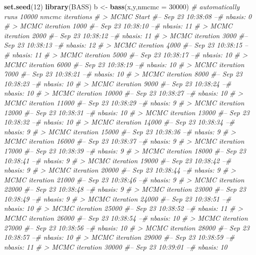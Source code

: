 \documentclass[
]{article}
\newenvironment{Shaded}{\begin{snugshade}}{\end{snugshade}}
\newcommand{\CommentTok}[1]{\textcolor[rgb]{0.56,0.35,0.01}{\textit{#1}}}
\newcommand{\DataTypeTok}[1]{\textcolor[rgb]{0.13,0.29,0.53}{#1}}
\newcommand{\DecValTok}[1]{\textcolor[rgb]{0.00,0.00,0.81}{#1}}
\newcommand{\KeywordTok}[1]{\textcolor[rgb]{0.13,0.29,0.53}{\textbf{#1}}}
\newcommand{\NormalTok}[1]{#1}
\newcommand{\StringTok}[1]{\textcolor[rgb]{0.31,0.60,0.02}{#1}}
\begin{document}
\begin{Shaded}
\begin{Highlighting}[]
\KeywordTok{set.seed}\NormalTok{(}\DecValTok{12}\NormalTok{)}
\KeywordTok{library}\NormalTok{(BASS)}
\NormalTok{b <-}\StringTok{ }\KeywordTok{bass}\NormalTok{(x,y,}\DataTypeTok{nmcmc =} \DecValTok{30000}\NormalTok{) }\CommentTok{# automatically runs 10000 nmcmc iterations}
\CommentTok{# > MCMC Start #-- Sep 23 10:38:08 --# nbasis: 0 }
\CommentTok{# > MCMC iteration 1000 #-- Sep 23 10:38:10 --# nbasis: 11 }
\CommentTok{# > MCMC iteration 2000 #-- Sep 23 10:38:12 --# nbasis: 11 }
\CommentTok{# > MCMC iteration 3000 #-- Sep 23 10:38:13 --# nbasis: 12 }
\CommentTok{# > MCMC iteration 4000 #-- Sep 23 10:38:15 --# nbasis: 11 }
\CommentTok{# > MCMC iteration 5000 #-- Sep 23 10:38:17 --# nbasis: 10 }
\CommentTok{# > MCMC iteration 6000 #-- Sep 23 10:38:19 --# nbasis: 10 }
\CommentTok{# > MCMC iteration 7000 #-- Sep 23 10:38:21 --# nbasis: 10 }
\CommentTok{# > MCMC iteration 8000 #-- Sep 23 10:38:23 --# nbasis: 10 }
\CommentTok{# > MCMC iteration 9000 #-- Sep 23 10:38:24 --# nbasis: 10 }
\CommentTok{# > MCMC iteration 10000 #-- Sep 23 10:38:27 --# nbasis: 10 }
\CommentTok{# > MCMC iteration 11000 #-- Sep 23 10:38:29 --# nbasis: 9 }
\CommentTok{# > MCMC iteration 12000 #-- Sep 23 10:38:31 --# nbasis: 10 }
\CommentTok{# > MCMC iteration 13000 #-- Sep 23 10:38:32 --# nbasis: 10 }
\CommentTok{# > MCMC iteration 14000 #-- Sep 23 10:38:34 --# nbasis: 9 }
\CommentTok{# > MCMC iteration 15000 #-- Sep 23 10:38:36 --# nbasis: 9 }
\CommentTok{# > MCMC iteration 16000 #-- Sep 23 10:38:37 --# nbasis: 9 }
\CommentTok{# > MCMC iteration 17000 #-- Sep 23 10:38:39 --# nbasis: 9 }
\CommentTok{# > MCMC iteration 18000 #-- Sep 23 10:38:41 --# nbasis: 9 }
\CommentTok{# > MCMC iteration 19000 #-- Sep 23 10:38:42 --# nbasis: 9 }
\CommentTok{# > MCMC iteration 20000 #-- Sep 23 10:38:44 --# nbasis: 9 }
\CommentTok{# > MCMC iteration 21000 #-- Sep 23 10:38:46 --# nbasis: 9 }
\CommentTok{# > MCMC iteration 22000 #-- Sep 23 10:38:48 --# nbasis: 9 }
\CommentTok{# > MCMC iteration 23000 #-- Sep 23 10:38:49 --# nbasis: 9 }
\CommentTok{# > MCMC iteration 24000 #-- Sep 23 10:38:51 --# nbasis: 10 }
\CommentTok{# > MCMC iteration 25000 #-- Sep 23 10:38:52 --# nbasis: 11 }
\CommentTok{# > MCMC iteration 26000 #-- Sep 23 10:38:54 --# nbasis: 10 }
\CommentTok{# > MCMC iteration 27000 #-- Sep 23 10:38:56 --# nbasis: 10 }
\CommentTok{# > MCMC iteration 28000 #-- Sep 23 10:38:57 --# nbasis: 10 }
\CommentTok{# > MCMC iteration 29000 #-- Sep 23 10:38:59 --# nbasis: 11 }
\CommentTok{# > MCMC iteration 30000 #-- Sep 23 10:39:01 --# nbasis: 10}
\end{Highlighting}
\end{Shaded}
\end{document}
